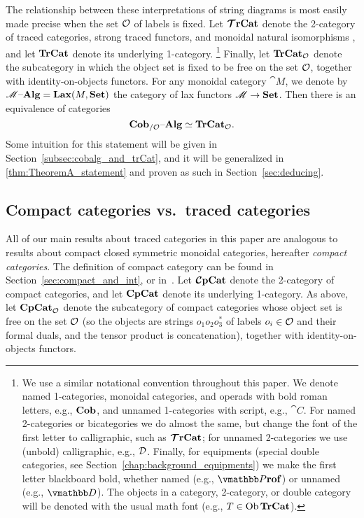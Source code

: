 \documentclass[11pt,oneside,article]{memoir}
\begin{document}
The relationship between these interpretations of string diagrams is most easily made precise when
the set $\mathcal{O}$ of labels is fixed. Let $\bm{\mathcal{T}}\mathbf{rCat}$ denote the 2-category of traced categories,
strong traced functors, and monoidal natural isomorphisms \cite{HK}, and let $\mathbf{TrCat}$ denote its
underlying 1-category.%
\footnote{
   We use a similar notational convention throughout this paper. We denote named 1-categories,
   monoidal categories, and operads with bold roman letters, e.g., $\mathbf{Cob}$, and unnamed
   1-categories with script, e.g., $\cat{C}$. For named 2-categories or bicategories we do almost
   the same, but change the font of the first letter to calligraphic, such as $\bm{\mathcal{T}}\mathbf{rCat}$; for
   unnamed 2-categories we use (unbold) calligraphic, e.g., $\mathcal{D}$. Finally, for equipments
   (special double categories, see Section~\ref{chap:background_equipments}) we make the first letter
   blackboard bold, whether named (e.g., $\ndcat{P}{rof}$) or unnamed (e.g., $\dcat{D}$). The
   objects in a category, 2-category, or double category will be denoted with the usual math font
   (e.g., $T\in\operatorname{Ob}\mathbf{TrCat}$).
}
Finally, let $\mathbf{TrCat}_{\mathcal{O}}$ denote the subcategory in which the object set is fixed to be free
on the set $\mathcal{O}$, together with identity-on-objects functors. For
any monoidal category $\cat{M}$, we denote by $\mathscr{M}{\text \textendash}\mathbf{Alg}=\mathbf{Lax}(M,\mathbf{Set})$ the category of lax
functors $\mathscr{M}\to\mathbf{Set}$. Then there is an equivalence of categories
\begin{equation}\label{eq:single_fiber_tr}
   \mathbf{Cob}_{/\mathcal{O}}{\text \textendash}\mathbf{Alg}\simeq\mathbf{TrCat}_{\mathcal{O}}.
\end{equation}
Some intuition for this statement will be given in Section~\ref{subsec:cobalg_and_trCat}, and it
will be generalized in \ref{thm:TheoremA_statement} and proven as such in Section~\ref{sec:deducing}.

\subsection{Compact categories vs.\ traced categories}

All of our main results about traced categories in this paper are analogous to results about compact closed
symmetric monoidal categories, hereafter \emph{compact categories}. The definition of compact
category can be found in Section~\ref{sec:compact_and_int}, or in~\cite{MacLane}. Let $\bm{\mathcal{C}}\mathbf{pCat}$
denote the 2-category of compact categories, and let $\mathbf{CpCat}$ denote its underlying 1-category. As
above, let $\mathbf{CpCat}_{\mathcal{O}}$ denote the subcategory of compact categories whose object set is
free on the set $\mathcal{O}$ (so the objects are strings $o_1o_2o_3^*$ of labels $o_i\in\mathcal{O}$ and
their formal duals, and the tensor product is concatenation), together with identity-on-objects
functors.
\end{document}
